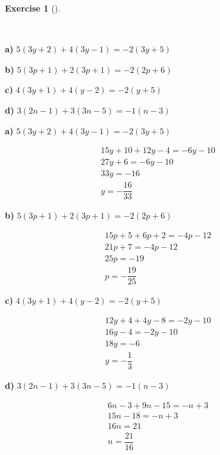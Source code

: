 \documentclass[
  letterpaper,
  DIV=11,
  numbers=noendperiod]{scrreprt}
\theoremstyle{definition}
\newtheorem{exercise}{Exercise}[chapter]
\theoremstyle{remark}
\begin{document}
\begin{exercise}[]\protect\hypertarget{exr-u5-12}{}\label{exr-u5-12}

~

\textbf{a)} \(\displaystyle 5(3y + 2) + 4(3y - 1) = -2(3y + 5)\)

\textbf{b)} \(\displaystyle 5(3p + 1) + 2(3p + 1) = -2(2p + 6)\)

\textbf{c)} \(\displaystyle 4(3y + 1) + 4(y - 2) = -2(y + 5)\)

\textbf{d)} \(\displaystyle 3(2n - 1) + 3(3n - 5) = -1(n - 3)\)

\begin{tcolorbox}[enhanced jigsaw, opacitybacktitle=0.6, coltitle=black, arc=.35mm, colframe=quarto-callout-tip-color-frame, colback=white, bottomrule=.15mm, left=2mm, colbacktitle=quarto-callout-tip-color!10!white, titlerule=0mm, opacityback=0, title=\textcolor{quarto-callout-tip-color}{\faLightbulb}\hspace{0.5em}{🔍 View Solutions}, leftrule=.75mm, breakable, rightrule=.15mm, bottomtitle=1mm, toptitle=1mm, toprule=.15mm]

\textbf{a)} \(\displaystyle 5(3y + 2) + 4(3y - 1) = -2(3y + 5)\)

\begin{align*}
15y + 10 + 12y - 4 = -6y - 10 \\ 27y + 6 = -6y - 10 \\ 33y = -16 \\ y = -\dfrac{16}{33}
\end{align*}

\textbf{b)} \(\displaystyle 5(3p + 1) + 2(3p + 1) = -2(2p + 6)\)

\begin{align*}
15p + 5 + 6p + 2 = -4p - 12 \\ 21p + 7 = -4p - 12 \\ 25p = -19 \\ p = -\dfrac{19}{25}
\end{align*}

\textbf{c)} \(\displaystyle 4(3y + 1) + 4(y - 2) = -2(y + 5)\)

\begin{align*}
12y + 4 + 4y - 8 = -2y - 10 \\ 16y - 4 = -2y - 10 \\ 18y = -6 \\ y = -\dfrac{1}{3}
\end{align*}

\textbf{d)} \(\displaystyle 3(2n - 1) + 3(3n - 5) = -1(n - 3)\)

\begin{align*}
6n - 3 + 9n - 15 = -n + 3 \\ 15n - 18 = -n + 3 \\ 16n = 21 \\ n = \dfrac{21}{16}
\end{align*}

\end{tcolorbox}

\end{exercise}
\end{document}
